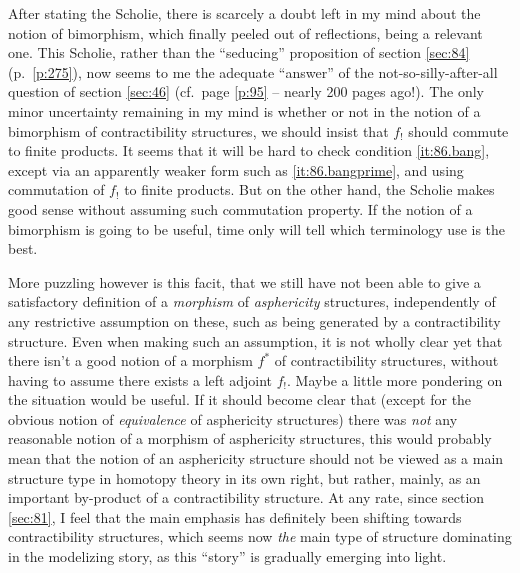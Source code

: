 After stating the Scholie, there is scarcely a doubt left in my mind
about the notion of bimorphism, which finally peeled out of
reflections, being a relevant one. This Scholie, rather than the
``seducing'' proposition of section \ref{sec:84} (p.\ \ref{p:275}),
now seems to me the adequate ``answer'' of the not-so-silly-after-all
question of section \ref{sec:46} (cf.\ page \ref{p:95} -- nearly 200
pages ago!). The only minor uncertainty remaining in my mind is
whether or not in the notion of a bimorphism of contractibility
structures, we should insist that $f_!$ should commute to finite
products. It seems that it will be hard to check condition
\ref{it:86.bang}, except via an apparently weaker form such as
\ref{it:86.bangprime}, and using commutation of $f_!$ to finite
products. But on the other hand, the Scholie makes good sense without
assuming such commutation property. If the notion of a bimorphism is
going to be useful, time only will tell which terminology use is the
best.

More puzzling however is this facit, that we still have not been able to give a satisfactory
definition of a \emph{morphism} of \emph{asphericity} structures,
independently of any restrictive assumption on these, such
as being generated by a contractibility structure. Even when making
such an assumption, it is not wholly clear yet that there isn't a good
notion of a morphism $f^*$ of contractibility structures, without
having to assume there exists a left adjoint $f_!$. Maybe a little
more pondering on the situation would be useful. If it should become
clear that (except for the obvious notion of \emph{equivalence} of
asphericity structures) there was \emph{not} any reasonable notion of
a morphism of asphericity structures, this would probably mean that
the notion of an asphericity structure should not be viewed as a main
structure type in homotopy theory in its own right, but rather,
mainly, as an important by-product of a contractibility structure. At
any rate, since section \ref{sec:81}, I feel that the main emphasis
has definitely been shifting towards contractibility structures, which
seems now \emph{the} main type of structure dominating in the
modelizing story, as this ``story'' is gradually emerging into light.

